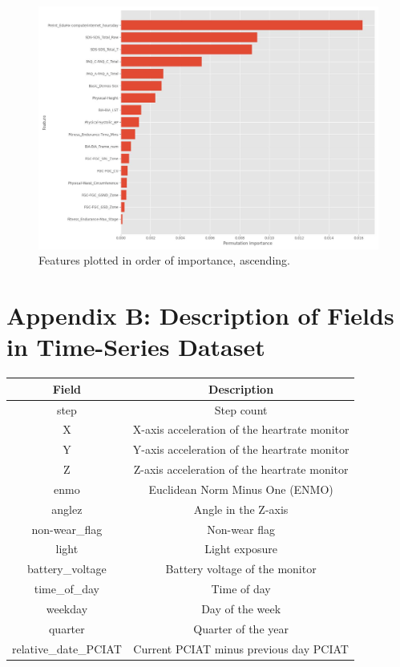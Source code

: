 \documentclass[12pt]{extarticle}
\begin{document}
\begin{figure}[h!]
    \centering
    \includegraphics[scale=0.4]{"./images/feature_importance.jpg"}
    \caption{Features plotted in order of importance, ascending.}
\end{figure}

\section*{Appendix B: Description of Fields in Time-Series Dataset}

\begin{table}[h!]
    \centering
    \begin{tabular}{|c|c|}
    \hline
    \textbf{Field} & \textbf{Description} \\
    \hline
    step & Step count \\
    X & X-axis acceleration of the heartrate monitor \\
    Y & Y-axis acceleration of the heartrate monitor \\
    Z & Z-axis acceleration of the heartrate monitor \\
    enmo & Euclidean Norm Minus One (ENMO) \\
    anglez & Angle in the Z-axis \\
    non-wear\_flag & Non-wear flag \\
    light & Light exposure \\
    battery\_voltage & Battery voltage of the monitor \\
    time\_of\_day & Time of day \\
    weekday & Day of the week \\
    quarter & Quarter of the year \\
    relative\_date\_PCIAT & Current PCIAT minus previous day PCIAT \\
    \hline
    \end{tabular}
    \label{table:fields}
\end{table}
\end{document}
